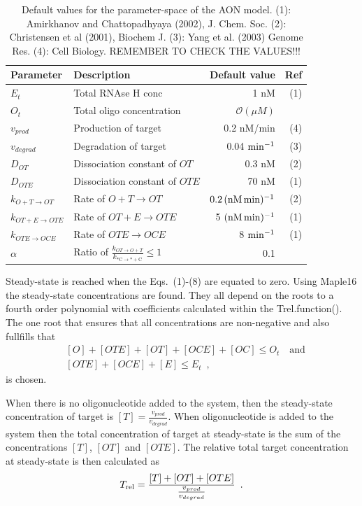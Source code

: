 \documentclass[a4paper,11pt]{article}
\newcommand{\vp}{v_{prod}}
\newcommand{\vd}{v_{degrad}}
\newcommand{\Trel}{T_{\rm{rel}}}
\begin{document}
\begin{table}[!b]
\caption{Default values for the parameter-space of the AON model. (1): Amirkhanov and Chattopadhyaya (2002), J. Chem. Soc. (2): Christensen et al (2001), Biochem J. (3): Yang et al. (2003) Genome Res. (4): Cell Biology.  REMEMBER TO CHECK THE VALUES!!!}\label{tb::par}
\setlength\extrarowheight{5pt}  %
\begin{tabular}{| l | l | r | r |}
\hline
Parameter & Description &Default value & Ref  \\
\hline
$E_t$ & Total RNAse H conc & 1 nM & (1)\\
$O_t$ & Total oligo concentration & $\mathcal{O}(\mu M )$ & {}\\
$v_{prod}$ & Production of target & 0.2 nM/min & (4)\\
$v_{degrad}$ & Degradation of target & 0.04 $\rm{min}^{-1}$ & (3)\\
$D_{OT}$ & Dissociation constant of $OT$ & 0.3 nM & (2) \\
$D_{OTE}$ & Dissociation constant of $OTE$  & 70 nM & (1) \\
$k_{O+T \to OT }$ & Rate of $O+T \to OT$ & $0.2 \, (\rm{nM \,min})^{-1}$ & (2)\\
$k_{OT+E \to OTE}$ & Rate of $OT+E \to OTE$  & 5 $(\rm{nM \,min})^{-1}$ &(1)\\
$k_{OTE \to OCE}$ & Rate of $OTE \to OCE$  & 8 $\rm{min}^{-1}$ & (1)\\
$\alpha$ & Ratio of $\frac{k_{OT \to O+T}}{k_{\mathrm{*C \to *+C}}} \le 1$ & 0.1  & {}\\
\hline
\end{tabular}
\end{table}

Steady-state is reached when the Eqs.~(1)-(8) are equated to zero. Using Maple16 the steady-state concentrations are found. They all depend on the roots to a fourth order polynomial with coefficients calculated within the Trel.function(). The one root that ensures that all concentrations are non-negative and also fullfills that
\begin{align*}
 &[O]+[OTE]+[OT]+[OCE]+[OC] \le O_t \quad \mathrm{and}\\ 
 &[OTE]+[OCE]+[E] \le E_t \enspace,
\end{align*}
is chosen. 

When there is no oligonucleotide added to the system, then the steady-state concentration of target is $[T]=\frac{\vp}{ \vd}$. When oligonucleotide is added to the system then the total concentration of target at steady-state is the sum of the concentrations $[T]$, $[OT]$ and $[OTE]$. The relative total target concentration at steady-state is then calculated as 
\begin{equation}
\Trel = \frac{[T]+[OT]+[OTE]}{\frac{\vp}{ \vd}} \enspace.
\end{equation}
\end{document}
